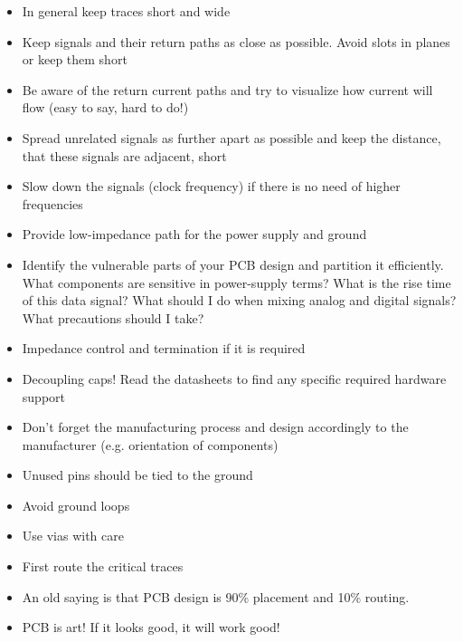 \documentclass[final]{cubedoc}
\begin{document}
	\begin{itemize}
		\item In general keep traces short and wide
		\item Keep signals and their return paths as close as possible. Avoid slots in planes or keep them short
		\item Be aware of the return current paths and try to visualize how current will flow (easy to say, hard to do!)
		\item Spread unrelated signals as further apart as possible and keep the distance, that these signals are adjacent, short
		\item Slow down the signals (clock frequency) if there is no need of higher frequencies
		\item Provide low-impedance path for the power supply and ground
		\item Identify the vulnerable parts of your PCB design and partition it efficiently. What components are sensitive in power-supply terms? What is the rise time of this data signal? What should I do when mixing analog and digital signals? What precautions should I take?
		\item Impedance control and termination if it is required
		\item Decoupling caps!
		\items Read the datasheets to find any specific required hardware support
		\item Don't forget the manufacturing process and design accordingly to the manufacturer (e.g. orientation of components)
		\item Unused pins should be tied to the ground
		\item Avoid ground loops
		\item Use vias with care
		\item First route the critical traces
		\item An old saying is that PCB design is 90\% placement and 10\% routing.
		\item PCB is art! If it looks good, it will work good!
	\end{itemize}
	
\end{document}
